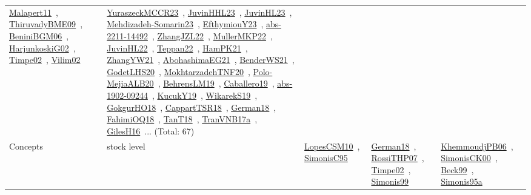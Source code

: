 {\begin{longtable}{lp{3cm}>{\raggedright\arraybackslash}p{6cm}>{\raggedright\arraybackslash}p{6cm}>{\raggedright\arraybackslash}p{8cm}}
\href{works/Malapert11.pdf}{Malapert11}~\cite{Malapert11}, \href{works/ThiruvadyBME09.pdf}{ThiruvadyBME09}~\cite{ThiruvadyBME09}, \href{works/BeniniBGM06.pdf}{BeniniBGM06}~\cite{BeniniBGM06}, \href{works/HarjunkoskiG02.pdf}{HarjunkoskiG02}~\cite{HarjunkoskiG02}, \href{works/Timpe02.pdf}{Timpe02}~\cite{Timpe02}, \href{works/Vilim02.pdf}{Vilim02}~\cite{Vilim02} & \href{works/YuraszeckMCCR23.pdf}{YuraszeckMCCR23}~\cite{YuraszeckMCCR23}, \href{works/JuvinHHL23.pdf}{JuvinHHL23}~\cite{JuvinHHL23}, \href{works/JuvinHL23.pdf}{JuvinHL23}~\cite{JuvinHL23}, \href{works/Mehdizadeh-Somarin23.pdf}{Mehdizadeh-Somarin23}~\cite{Mehdizadeh-Somarin23}, \href{works/EfthymiouY23.pdf}{EfthymiouY23}~\cite{EfthymiouY23}, \href{works/abs-2211-14492.pdf}{abs-2211-14492}~\cite{abs-2211-14492}, \href{works/ZhangJZL22.pdf}{ZhangJZL22}~\cite{ZhangJZL22}, \href{works/MullerMKP22.pdf}{MullerMKP22}~\cite{MullerMKP22}, \href{works/JuvinHL22.pdf}{JuvinHL22}~\cite{JuvinHL22}, \href{works/Teppan22.pdf}{Teppan22}~\cite{Teppan22}, \href{works/HamPK21.pdf}{HamPK21}~\cite{HamPK21}, \href{works/ZhangYW21.pdf}{ZhangYW21}~\cite{ZhangYW21}, \href{works/AbohashimaEG21.pdf}{AbohashimaEG21}~\cite{AbohashimaEG21}, \href{works/BenderWS21.pdf}{BenderWS21}~\cite{BenderWS21}, \href{works/GodetLHS20.pdf}{GodetLHS20}~\cite{GodetLHS20}, \href{works/MokhtarzadehTNF20.pdf}{MokhtarzadehTNF20}~\cite{MokhtarzadehTNF20}, \href{works/Polo-MejiaALB20.pdf}{Polo-MejiaALB20}~\cite{Polo-MejiaALB20}, \href{works/BehrensLM19.pdf}{BehrensLM19}~\cite{BehrensLM19}, \href{works/Caballero19.pdf}{Caballero19}~\cite{Caballero19}, \href{works/abs-1902-09244.pdf}{abs-1902-09244}~\cite{abs-1902-09244}, \href{works/KucukY19.pdf}{KucukY19}~\cite{KucukY19}, \href{works/WikarekS19.pdf}{WikarekS19}~\cite{WikarekS19}, \href{works/GokgurHO18.pdf}{GokgurHO18}~\cite{GokgurHO18}, \href{works/CappartTSR18.pdf}{CappartTSR18}~\cite{CappartTSR18}, \href{works/German18.pdf}{German18}~\cite{German18}, \href{works/FahimiOQ18.pdf}{FahimiOQ18}~\cite{FahimiOQ18}, \href{works/TanT18.pdf}{TanT18}~\cite{TanT18}, \href{works/TranVNB17a.pdf}{TranVNB17a}~\cite{TranVNB17a}, \href{works/GilesH16.pdf}{GilesH16}~\cite{GilesH16}... (Total: 67)\\
Concepts & stock level & \href{works/LopesCSM10.pdf}{LopesCSM10}~\cite{LopesCSM10}, \href{works/SimonisC95.pdf}{SimonisC95}~\cite{SimonisC95} & \href{works/German18.pdf}{German18}~\cite{German18}, \href{works/RossiTHP07.pdf}{RossiTHP07}~\cite{RossiTHP07}, \href{works/Timpe02.pdf}{Timpe02}~\cite{Timpe02}, \href{works/Simonis99.pdf}{Simonis99}~\cite{Simonis99} & \href{works/KhemmoudjPB06.pdf}{KhemmoudjPB06}~\cite{KhemmoudjPB06}, \href{works/SimonisCK00.pdf}{SimonisCK00}~\cite{SimonisCK00}, \href{works/Beck99.pdf}{Beck99}~\cite{Beck99}, \href{works/Simonis95a.pdf}{Simonis95a}~\cite{Simonis95a}\\

\end{longtable}}
